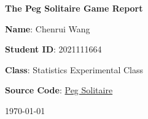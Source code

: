 \begin{titlepage}
    \centering
    \vspace*{3cm}
    {\LARGE \textbf{The Peg Solitaire Game Report}\par}
    \vspace{2cm}
    {\large \textbf{Name}: Chenrui Wang \par}
    \vspace{0.5cm}
    {\large \textbf{Student ID}: 2021111664 \par}
    \vspace{0.5cm}
    {\large \textbf{Class}: Statistics Experimental Class \par}
    \vspace{0.5cm}
    {\large \textbf{Source Code}: \href{https://github.com/Aoblex/PegSolitaire}{Peg Solitaire} \par}
    \vspace{2cm}
    {\large \today\par}
    \vfill
\end{titlepage}

